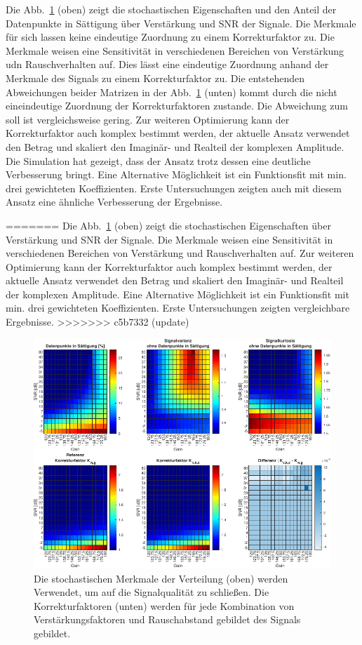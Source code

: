Die Abb.~\ref{fig:lut} (oben) zeigt die stochastischen Eigenschaften und den Anteil der Datenpunkte in Sättigung über Verstärkung und SNR der Signale. Die Merkmale für sich lassen keine eindeutige Zuordnung zu einem Korrekturfaktor zu. Die Merkmale weisen eine Sensitivität in verschiedenen Bereichen von Verstärkung udn Rauschverhalten auf. Dies lässt eine eindeutige Zuordnung anhand der Merkmale des Signals zu einem Korrekturfaktor zu. Die entstehenden Abweichungen beider Matrizen in der Abb.~\ref{fig:lut} (unten) kommt durch die nicht eineindeutige Zuordnung der Korrekturfaktoren zustande. Die Abweichung zum soll ist vergleichsweise gering. Zur weiteren Optimierung kann der Korrekturfaktor auch komplex bestimmt werden, der aktuelle Ansatz verwendet den Betrag und skaliert den Imaginär- und Realteil der komplexen Amplitude. Die Simulation hat gezeigt, dass der Ansatz trotz dessen eine deutliche Verbesserung bringt. Eine Alternative Möglichkeit ist ein Funktionsfit mit min. drei gewichteten Koeffizienten. Erste Untersuchungen zeigten auch mit diesem Ansatz eine ähnliche Verbesserung der Ergebnisse.

=======
Die Abb.~\ref{fig:lut} (oben) zeigt die stochastischen Eigenschaften über Verstärkung und SNR der Signale. Die Merkmale weisen eine Sensitivität in verschiedenen Bereichen von Verstärkung und Rauschverhalten auf. Zur weiteren Optimierung kann der Korrekturfaktor auch komplex bestimmt werden, der aktuelle Ansatz verwendet den Betrag und skaliert den Imaginär- und Realteil der komplexen Amplitude. Eine Alternative Möglichkeit ist ein Funktionsfit mit min. drei gewichteten Koeffizienten. Erste Untersuchungen zeigten vergleichbare Ergebnisse.
>>>>>>> c5b7332 (update)

\begin{figure}[th!]
	\centering
	\includegraphics[width=.9\textwidth]{../img/lut.pdf}
	\caption{Die stochastischen Merkmale der Verteilung (oben) werden Verwendet, um auf die Signalqualität zu schließen. Die Korrekturfaktoren (unten) werden für jede Kombination von Verstärkungsfaktoren und Rauschabstand gebildet des Signals gebildet.}
	\label{fig:lut} 
\end{figure}


